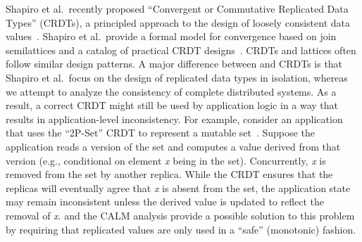 

Shapiro et al.\ recently proposed ``Convergent or Commutative Replicated Data
Types'' (CRDTs), a principled approach to the design of loosely consistent data
values~\cite{Shapiro2011b}. Shapiro et al.\ provide a formal model for
convergence based on join semilattices and a catalog of practical CRDT
designs~\cite{Shapiro2011a}. CRDTs and \lang lattices often follow similar
design patterns. A major difference between \lang and CRDTs is that Shapiro et
al.\ focus on the design of replicated data types in isolation, whereas we
attempt to analyze the consistency of complete distributed systems. As a result,
a correct CRDT might still be used by application logic in a way that results in
application-level inconsistency. For example, consider an application that uses
the ``2P-Set'' CRDT to represent a mutable set~\cite{Shapiro2011a}. Suppose the
application reads a version of the set and computes a value derived from that
version (e.g., conditional on element \emph{x} being in the set). Concurrently,
\emph{x} is removed from the set by another replica. While the CRDT ensures that
the replicas will eventually agree that \emph{x} is absent from the set, the
application state may remain inconsistent unless the derived value is updated to
reflect the removal of \emph{x}. \lang and the CALM analysis provide a possible
solution to this problem by requiring that replicated values are only used in a
``safe'' (monotonic) fashion.


